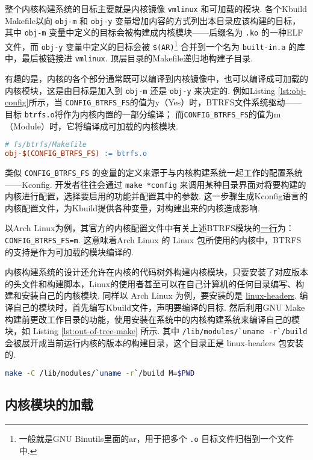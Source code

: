 整个内核构建系统的目标主要就是内核镜像 \lstinline{vmlinux} 和可加载的模块.
各个Kbuild Makefile以向 \lstinline{obj-m} 和 \lstinline{obj-y} 变量增加内容的方式列出本目录应该构建的目标，
其中 \lstinline{obj-m} 变量中定义的目标会被构建成内核模块——后缀名为 \lstinline{.ko} 的一种ELF文件，而 \lstinline{obj-y} 变量中定义的目标会被 \lstinline{$(AR)}\footnote{一般就是GNU Binutils里面的ar，用于把多个 \lstinline{.o} 目标文件归档到一个文件中.} 合并到一个名为 \lstinline{built-in.a} 的库中，最后被链接进 \lstinline{vmlinux}.
顶层目录的Makefile递归地构建子目录.

有趣的是，内核的各个部分通常既可以编译到内核镜像中，也可以编译成可加载的内核模块，这是由目标是加入到 \lstinline{obj-m} 还是 \lstinline{obj-y} 来决定的.
例如Listing \ref{lst:obj-config}所示，当 \lstinline{CONFIG_BTRFS_FS}的值为y（Yes）时，BTRFS文件系统驱动——目标 \lstinline{btrfs.o}将作为内核内置的一部分编译；
而\lstinline{CONFIG_BTRFS_FS}的值为m（Module）时，它将编译成可加载的内核模块.

\begin{lstlisting}[language=make, caption=可配置的编译目标, label=lst:obj-config]
# fs/btrfs/Makefile
obj-$(CONFIG_BTRFS_FS) := btrfs.o
\end{lstlisting}

类似 \lstinline{CONFIG_BTRFS_FS} 的变量的定义来源于与内核构建系统一起工作的配置系统——Kconfig.
开发者往往会通过 \lstinline{make *config} 来调用某种目录界面对将要构建的内核进行配置，选择要启用的功能并配置其中的参数.
这一步骤生成Kconfig语言的内核配置文件，为Kbuild提供各种变量，对构建出来的内核造成影响.

以Arch Linux为例，其官方的内核配置文件中有关上述BTRFS模块的\href{https://github.com/archlinux/svntogit-packages/blob/974377e2b1ab9e822c71fbb05a82bfb8dd9a7971/trunk/config#L9619}{一行}为：
\lstinline{CONFIG_BTRFS_FS=m}.
这意味着Arch Linux 的 Linux 包所使用的内核中，BTRFS的支持是作为可加载的模块编译的.

内核构建系统的设计还允许在内核的代码树外构建内核模块，只要安装了对应版本的头文件和构建脚本，Linux的使用者甚至可以在自己计算机的任何目录编写、构建和安装自己的内核模块.
同样以 Arch Linux 为例，要安装的是 \href{https://archlinux.org/packages/core/x86_64/linux-headers/}{linux-headers}.
编译自己的模块时，首先编写Kbuild文件，声明要编译的目标.
然后利用GNU Make构建前更改工作目录的功能，使用安装在系统中的内核构建系统来编译自己的模块，如 Listing \ref{lst:out-of-tree-make} 所示.
其中 \lstinline{/lib/modules/`uname -r`/build} 会被展开成当前运行内核的版本的构建目录，这个目录正是 linux-headers 包安装的.
\begin{lstlisting}[language=sh, caption=为本机的内核构建模块, label=lst:out-of-tree-make]
make -C /lib/modules/`uname -r`/build M=$PWD
\end{lstlisting}
\subsection{内核模块的加载}
